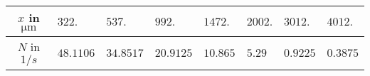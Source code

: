 \begin{tabular}{c|*{7}{*{1}{l}}}
$x$ in $\si{\micro\meter}$ & $322.$ & $537.$ & $992.$ & $1472.$ & $2002.$ & $3012.$ & $4012.$ \\ \hline
$N$ in $\si{1/s}$ & $48.1106$ & $34.8517$ & $20.9125$ & $10.865$ & $5.29$ & $0.9225$ & $0.3875$\end{tabular}
